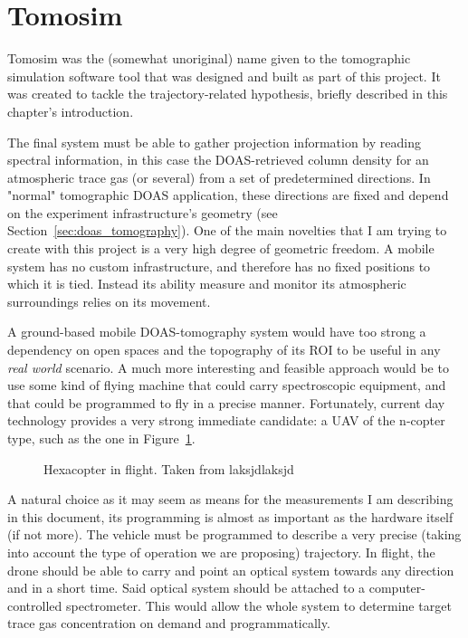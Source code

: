 


\section{Tomosim}%
\label{sec:tomosim}

Tomosim was the (somewhat unoriginal) name given to the tomographic
simulation software tool that was designed and built as part of this
project. It was created to tackle the trajectory-related hypothesis,
briefly described in this chapter's introduction.

The final system must be able to gather projection information by
reading spectral information, in this case the \gls{DOAS}-retrieved
column density for an atmospheric trace gas (or several) from a set of
predetermined directions. In "normal" tomographic \gls{DOAS}
application, these directions are fixed and depend on the experiment
infrastructure's geometry (see Section~\ref{sec:doas_tomography}). One
of the main novelties that I am trying to create with this project is a
very high degree of geometric freedom. A mobile system has no custom
infrastructure, and therefore has no fixed positions to which it is
tied. Instead its ability measure and monitor its atmospheric
surroundings relies on its movement. 

A ground-based mobile \gls{DOAS}-tomography system would have too strong
a dependency on open spaces and the topography of its \gls{ROI} to be
useful in any \textit{real world} scenario. A much more interesting and
feasible approach would be to use some kind of flying machine that could
carry spectroscopic equipment, and that could be programmed to fly in a
precise manner. Fortunately, current day technology provides a very
strong immediate candidate: a \gls{UAV} of the n-copter type, such as
the one in Figure~\ref{fig:an_hexacopter}.

\begin{figure}[htpb]
    \centering
    \caption{Hexacopter in flight. Taken from laksjdlaksjd}
    \label{fig:an_hexacopter}
\end{figure}

A natural choice as it may seem as means for the measurements I am
describing in this document, its programming is almost  as important as
the hardware itself (if not more). The vehicle must be programmed to
describe a very precise (taking into account the type of operation we
are proposing) trajectory. In flight, the drone should be able to carry
and point an optical system towards any direction and in a short time.
Said optical system should be attached to a computer-controlled
spectrometer. This would allow the whole system to determine target
trace gas concentration on demand and programmatically.

